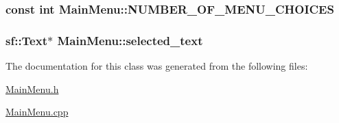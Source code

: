 \subsubsection[{N\+U\+M\+B\+E\+R\+\_\+\+O\+F\+\_\+\+M\+E\+N\+U\+\_\+\+C\+H\+O\+I\+C\+E\+S}]{\setlength{\rightskip}{0pt plus 5cm}const int Main\+Menu\+::\+N\+U\+M\+B\+E\+R\+\_\+\+O\+F\+\_\+\+M\+E\+N\+U\+\_\+\+C\+H\+O\+I\+C\+E\+S\hspace{0.3cm}{\ttfamily [protected]}}\label{class_main_menu_a22354cddce5d5cc36bfa1dbc5eb951fa}
\hypertarget{class_main_menu_a0a0ebee9f052974eb46c411f1dbaa2fc}{}
\subsubsection[{selected\+\_\+text}]{\setlength{\rightskip}{0pt plus 5cm}sf\+::\+Text$\ast$ Main\+Menu\+::selected\+\_\+text\hspace{0.3cm}{\ttfamily [protected]}}\label{class_main_menu_a0a0ebee9f052974eb46c411f1dbaa2fc}


The documentation for this class was generated from the following files\+:\begin{DoxyCompactItemize}
\item 
\hyperlink{_main_menu_8h}{Main\+Menu.\+h}\item 
\hyperlink{_main_menu_8cpp}{Main\+Menu.\+cpp}\end{DoxyCompactItemize}
